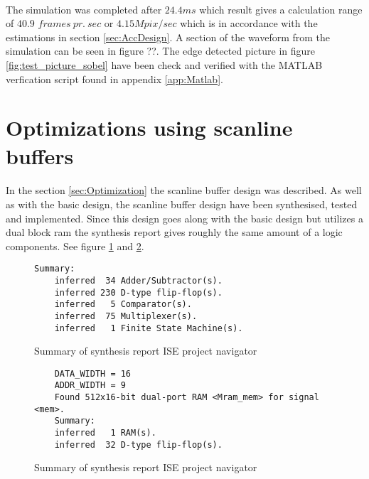 \paragraph*{}
The simulation was completed after $24.4ms$ which result gives a calculation range of $40.9$ $frames~pr.~sec$ or $4.15Mpix/sec$ which is in accordance with the estimations in section \ref{sec:AccDesign}. A section of the waveform from the simulation can be seen in figure ??. The edge detected picture in figure \ref{fig:test_picture_sobel} have been check and verified with the MATLAB verfication script found in appendix \ref{app:Matlab}.   

\section{Optimizations using scanline buffers}
\paragraph*{}
In the section \ref{sec:Optimization} the scanline buffer design was described. As well as with the basic design, the scanline buffer design have been synthesised, tested and implemented. Since this design goes along with the basic design but utilizes a dual block ram the synthesis report gives roughly the same amount of a logic components. See figure \ref{fig:sum_synthesis_report} and \ref{fig:sum_synthesis_report_ram}.   
    
\begin{figure}[H]
\centering
\begin{BVerbatim}
Summary:
    inferred  34 Adder/Subtractor(s).
    inferred 230 D-type flip-flop(s).
    inferred   5 Comparator(s).
    inferred  75 Multiplexer(s).
    inferred   1 Finite State Machine(s).
\end{BVerbatim}
\caption{Summary of synthesis report ISE project navigator}
\label{fig:sum_synthesis_report}
\end{figure}

\begin{figure}[H]
\centering
\begin{BVerbatim}
    DATA_WIDTH = 16
    ADDR_WIDTH = 9
    Found 512x16-bit dual-port RAM <Mram_mem> for signal <mem>.
    Summary:
	inferred   1 RAM(s).
	inferred  32 D-type flip-flop(s).
\end{BVerbatim}
\caption{Summary of synthesis report ISE project navigator}
\label{fig:sum_synthesis_report_ram}
\end{figure}

